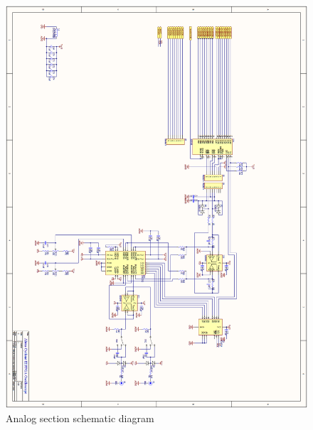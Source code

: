 \begin{appendices}
\begin{figure}[ht!]
    \centering
    \includegraphics[width=6in]{circuit/analog_page.png}
		\caption{Analog section schematic diagram}
\end{figure}


\end{appendices}
